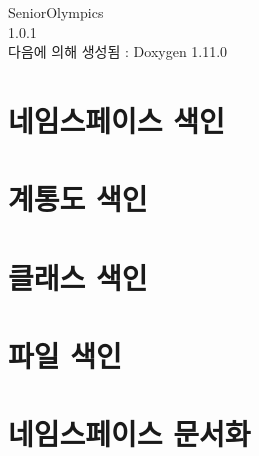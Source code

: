 \documentclass[twoside]{book}
\newcommand{\+}{\discretionary{\mbox{\scriptsize$\hookleftarrow$}}{}{}}
\newcommand{\clearemptydoublepage}{%
    \newpage{\pagestyle{empty}\cleardoublepage}%
  }
\begin{document}
  \raggedbottom
    \hypersetup{pageanchor=false,
                bookmarksnumbered=true,
                pdfencoding=unicode
               }
  \begin{titlepage}
  \vspace*{7cm}
  \begin{center}%
  {\Large Senior\+Olympics}\\
  [1ex]\large 1.\+0.\+1 \\
  \vspace*{1cm}
  {\large 다음에 의해 생성됨 \+:  Doxygen 1.11.0}\\
  \end{center}
  \end{titlepage}
  \clearemptydoublepage
  \tableofcontents
  \clearemptydoublepage
  \hypersetup{pageanchor=true}
\chapter{네임스페이스 색인}

\chapter{계통도 색인}

\chapter{클래스 색인}

\chapter{파일 색인}

\chapter{네임스페이스 문서화}









\end{document}

